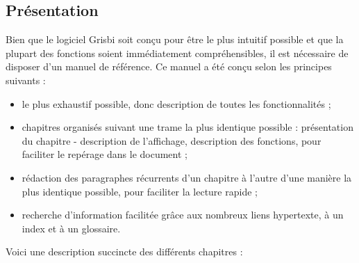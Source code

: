 \subsection{Présentation\label{introduction-manual-presentation}}

Bien que le logiciel Grisbi soit conçu pour être le plus intuitif possible et que la plupart des fonctions soient immédiatement compréhensibles, il est nécessaire de disposer d'un manuel de référence. Ce manuel a été conçu selon les principes suivants :

\begin{itemize} 
	\item le plus exhaustif possible, donc description de toutes les fonctionnalités ;
	\item chapitres organisés suivant une trame la plus identique possible : présentation du chapitre - description de l'affichage, description des fonctions, pour faciliter le repérage dans le document ;
	\item rédaction des paragraphes récurrents d'un chapitre à l'autre d'une manière la plus identique possible, pour faciliter la lecture rapide ;
	\item recherche d'information facilitée grâce aux nombreux \gls{liens hypertexte}, à un index et à un glossaire.
\end{itemize}

Voici une description succincte des différents chapitres :

